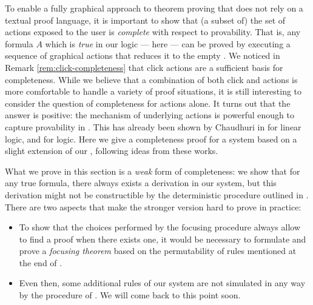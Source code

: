To enable a fully graphical approach to theorem proving that does not rely on a
textual proof language, it is important to show that (a subset of) the set of
actions exposed to the user is \emph{complete} with respect to provability. That
is, any formula $A$ which is \emph{true} in our logic --- here 
 --- can be proved by executing a sequence of graphical actions that reduces
it to the empty . We noticed in Remark \ref{rem:click-completeness} that
click actions are a sufficient basis for completeness. While we believe that a
combination of both click and  actions is more comfortable to handle a
variety of proof situations, it is still interesting to consider the question of
completeness for  actions alone. It turns out that the answer is positive:
the mechanism of \emph{} underlying  actions is powerful
enough to capture provability in . This has already been shown by Chaudhuri
in \cite{Chaudhuri2013} for linear logic, and \cite{DBLP:conf/cade/Chaudhuri21}
for  logic. Here we give a completeness proof for a system based
on a slight extension of our , following ideas from these works.

\begin{remark}
  What we prove in this section is a \emph{weak} form of completeness: we show
  that for any true formula, there always exists a derivation in our  system, but this derivation might not be constructible by the
  deterministic procedure outlined in . There are two aspects
  that make the stronger version hard to prove in practice:
  \begin{itemize}
    \item To show that the choices performed by the focusing procedure always
    allow to find a proof when there exists one, it would be necessary to
    formulate and prove a \emph{focusing theorem} based on the permutability of
    rules mentioned at the end of .
    \item Even then, some additional rules of our  system are
    not simulated in any way by the  procedure of . We will come
    back to this point soon.
  \end{itemize}  
\end{remark}

